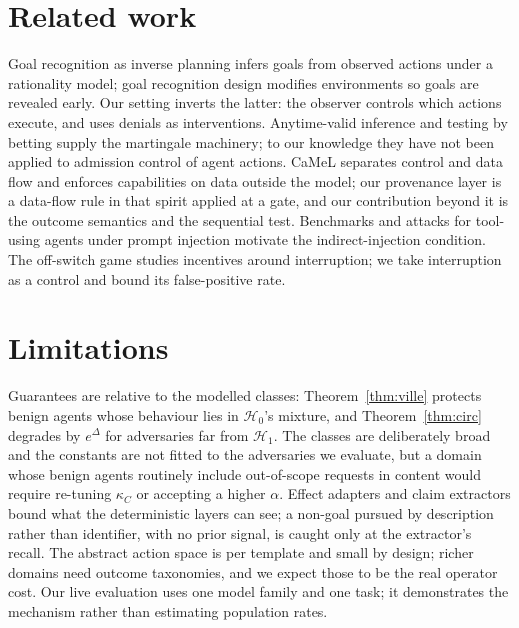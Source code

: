 \documentclass[11pt]{article}
\theoremstyle{definition}
\theoremstyle{remark}
\newcommand{\Hb}{\mathcal{H}_0}
\newcommand{\Ha}{\mathcal{H}_1}
\begin{document}
\FloatBarrier
\section{Related work}
Goal recognition as inverse planning \cite{baker2009,ramirez2010} infers goals from observed actions under a rationality model; goal recognition design \cite{keren2014} modifies environments so goals are revealed early. Our setting inverts the latter: the observer controls which actions execute, and uses denials as interventions. Anytime-valid inference and testing by betting \cite{ramdas2023,shafer2021,ville1939} supply the martingale machinery; to our knowledge they have not been applied to admission control of agent actions. CaMeL \cite{debenedetti2025} separates control and data flow and enforces capabilities on data outside the model; our provenance layer is a data-flow rule in that spirit applied at a gate, and our contribution beyond it is the outcome semantics and the sequential test. Benchmarks and attacks for tool-using agents under prompt injection \cite{debenedetti2024,greshake2023} motivate the indirect-injection condition. The off-switch game \cite{hadfield2017} studies incentives around interruption; we take interruption as a control and bound its false-positive rate.

\section{Limitations}
Guarantees are relative to the modelled classes: Theorem~\ref{thm:ville} protects benign agents whose behaviour lies in $\Hb$'s mixture, and Theorem~\ref{thm:circ} degrades by $e^\Delta$ for adversaries far from $\Ha$. The classes are deliberately broad and the constants are not fitted to the adversaries we evaluate, but a domain whose benign agents routinely include out-of-scope requests in content would require re-tuning $\kappa_C$ or accepting a higher $\alpha$. Effect adapters and claim extractors bound what the deterministic layers can see; a non-goal pursued by description rather than identifier, with no prior signal, is caught only at the extractor's recall. The abstract action space is per template and small by design; richer domains need outcome taxonomies, and we expect those to be the real operator cost. Our live evaluation uses one model family and one task; it demonstrates the mechanism rather than estimating population rates.
\end{document}
